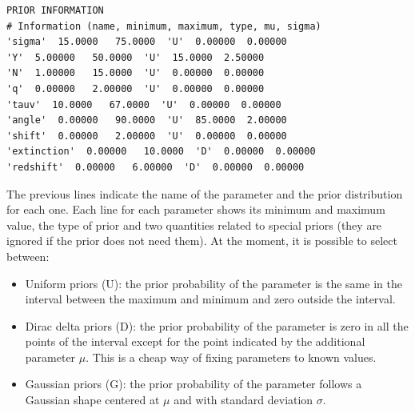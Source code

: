 \documentclass[12pt]{article}
\begin{document}
\begin{verbatim}
PRIOR INFORMATION
# Information (name, minimum, maximum, type, mu, sigma)
'sigma'  15.0000   75.0000  'U'  0.00000  0.00000
'Y'  5.00000   50.0000  'U'  15.0000  2.50000
'N'  1.00000   15.0000  'U'  0.00000  0.00000
'q'  0.00000   2.00000  'U'  0.00000  0.00000
'tauv'  10.0000   67.0000  'U'  0.00000  0.00000
'angle'  0.00000   90.0000  'U'  85.0000  2.00000
'shift'  0.00000   2.00000  'U'  0.00000  0.00000
'extinction'  0.00000   10.0000  'D'  0.00000  0.00000
'redshift'  0.00000   6.00000  'D'  0.00000  0.00000
\end{verbatim}
The previous lines indicate the name of the parameter and the prior distribution for 
each one. Each line for each parameter shows its minimum and maximum value, the type
of prior and two quantities related to special priors (they are ignored if the prior
does not need them). At the moment, it is possible to 
select between:
\begin{itemize}
 \item Uniform priors (U): the prior probability of the parameter is the same in the interval
   between the maximum and minimum and zero outside the interval.
 \item Dirac delta priors (D): the prior probability of the parameter is zero in all the
   points of the interval except for the point indicated by the additional parameter $\mu$.
   This is a cheap way of fixing parameters to known values.
 \item Gaussian priors (G): the prior probability of the parameter follows a Gaussian shape
   centered at $\mu$ and with standard deviation $\sigma$.
\end{itemize}

\end{document}
